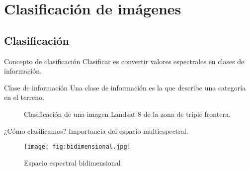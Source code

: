 \section{Clasificación de imágenes}

\subsection{Clasificación}
\begin{frame}{}
\begin{block}{Concepto de clasificación}
  Clasificar es convertir valores espectrales en clases de información.
\end{block}
\end{frame}

\begin{frame}{}
\begin{block}{Clase de información}
  Una clase de información es la que describe una categoría en el terreno.
\end{block}
\end{frame}

\begin{frame}{}
  \begin{figure}
    \centering
    \hspace{1cm}
    \caption{Clasificación de una imagen Landsat 8 de la zona de triple frontera.}
    \label{}
  \end{figure}
\end{frame}

\begin{frame}{}
\begin{block}{¿Cómo clasificamos?}
 Importancia del espacio multiespectral.
\end{block}
\end{frame}

\begin{frame}{}
  \begin{figure}
    \centering
    \texttt{[image: fig:bidimensional.jpg]}
    \caption{Espacio espectral bidimensional}
    \label{}
  \end{figure}
\end{frame}


